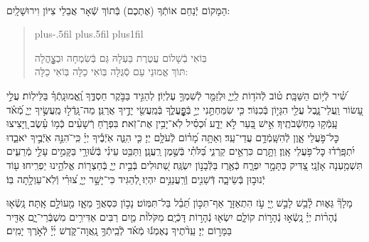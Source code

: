 \documentclass[twoside, openany, parskip=half, 11pt]{book}
\begin{document}
\begin{sometimes}

\\
הַמָּקוֹם יְֿנַחֵם אוֹתְֿךָ (אֶתְכֶם) בְּֿתוֹךְ שְֿׁאָר אֲבֵלֵי צִיּוֹן וִירוּשָׁלָֽיִם:

\end{sometimes}

\begin{quote}
 \leftskip=0pt plus-.5fil
 \rightskip=0pt plus.5fil
 \parfillskip=0pt plus1fil

 בּֽוֹאִי בְֿשָׁלוֹם עֲטֶרֶת בַּעְלָהּ \hfill
גַּם בְּֿשִׂמְחָה וּבְצׇׇׇׇׇׇׇׇָהֳלָה \\
תּוֹךְ אֱמוּנֵי עַם סְֿגֻּלָּה \hfill
בּֽוֹאִי כַלָּה בּֽוֹאִי כַלָּה:

\lechadodi

\end{quote}


שִׁ֝֗יר לְֿי֥וֹם הַשַּׁבָּֽת׃
ט֗וֹב לְֿהֹד֥וֹת לַֽיְיָ֑ וּלְזַמֵּ֖ר לְֿשִׁמְךָ֣ עֶלְיֽוֹן׃
לְהַגִּ֣יד בַּבֹּ֣קֶר חַסְדֶּ֑ךָ וֶֽ֝אֱמוּנָֽתְֿךָ֗ בַּלֵּילֽוֹת׃
עֲלֵ֣י עָ֭שׂוֹר וַֽעֲלֵי־נָ֑בֶל עֲלֵ֖י הִגָּי֣וֹן בְּֿכִנּֽוֹר׃
כִּ֤י שִׂמַּחְתַּ֣נִי יְיָ֣ בְּֿפׇׇׇׇׇׇׇׇׇׇׇׇׇׇָֽעֳלֶ֑ךָ בְּֿמַֽעֲשֵׂ֖י יָדֶ֣יךָ אֲרַנֵּֽן׃
מַה־גָּֽדְֿל֣וּ מַֽעֲשֶׂ֣יךָ יְיָ֑ מְֿ֝אֹ֗ד עָֽמְֿק֥וּ מַחְשְֿׁבֹתֶֽיךָ׃
אִ֣ישׁ בַּ֭עַר לֹ֣א יֵדָ֑ע וּ֝כְסִ֗יל לֹֽא־יָבִ֥ין אֶת־זֹֽאת׃
בִּפְרֹ֤חַ רְֿשָׁעִ֨ים כְּֿמ֥וֹ עֵ֗שֶׂב וַ֭יָּצִיצוּ כׇּל־פֹּ֣עֲלֵי אָ֑וֶן לְֿהִשָּֽׁמְֿדָ֥ם עֲדֵי־עַֽד׃
וְאַתָּ֥ה מָ֝ר֗וֹם לְֿעֹלָ֥ם יְיָ׃
כִּ֤י הִנֵּ֢ה אֹֽיְֿבֶ֡יךָ יְיָ֗ כִּֽי־ֹהִנֵּ֣ה אֹֽיְֿבֶ֣יךָ יֹאבֵ֑דוּ יִ֝תְפָּֽרְֿד֗וּ כׇּל־פֹּ֥עֲלֵי אָֽוֶן׃
וַתָּ֣רֶם כִּרְאֵ֣ים קַרְנִ֑י בַּ֝לֹּתִ֗י בְּֿשֶׁ֣מֶן רַֽעֲנָֽן׃
וַתַּבֵּ֥ט עֵינִ֗י בְּֿשׁ֫וּרָ֥י בַּקָּמִ֣ים עָלַ֣י מְֿרֵעִ֑ים תִּשְׁמַ֥עְנָה אָזְֿנָֽי׃
 צַ֭דִּיק כַּתָּמָ֣ר יִפְרָ֑ח כְּֿאֶ֖רֶז בַּלְּֿבָנ֣וֹן יִשְׂגֶּֽה׃
שְׁ֭תוּלִים בְּֿבֵ֣ית יְיָ֑ בְּֿחַצְר֖וֹת אֱלֹהֵ֣ינוּ יַפְרִֽיחוּ׃
ע֖וֹד יְֿנוּב֣וּן בְּֿשֵׂיבָ֑ה דְּֿשֵׁנִ֖ים וְֿרַֽעֲנַנִּ֣ים יִהְיֽוּ׃
לְ֭הַגִּיד כִּי־יָשָׁ֣ר יְיָ֑ צ֝וּרִ֗י וְֿלֹֽא־עַוְלָ֥תָה בּֽוֹ׃

 מָלָךְ֘ גֵּא֢וּת לָ֫בֵ֥שׁ לָבֵ֣שׁ יְ֖יָ עֹ֣ז הִתְאַזָּר֑ אַף־תִּכּ֣וֹן תֵּ֝בֵ֗ל בַּל־תִּמּֽוֹט׃
נָכ֣וֹן כִּסְאֲךָ֣ מֵאָ֑ז מֵ֖עוֹלָ֣ם אָֽתָּה׃
נָֽשְֿׂא֤וּ נְֿהָר֨וֹת יְיָ֗ נָֽשְֿׂא֣וּ נְֿהָר֣וֹת קוֹלָ֑ם יִשְׂא֖וּ נְֿהָר֣וֹת דָּכְֿיָֽם׃
 מִקֹּלוֹ֨ת מַ֤יִם רַבִּים אַדִּירִ֥ים מִשְׁבְּֿרֵי־יָ֑ם אַדִּ֖יר בַּמָּר֣וֹם יְיָ׃
עֵֽדֹ֨תֶיךָ נֶאֶמְנ֬וּ מְֿאֹ֗ד לְֿבֵֽיתְֿךָ֥ נָֽאֲוָה־קֹּ֑דֶשׁ יְ֜יָ֗ לְֿאֹ֣רֶךְ יָמִֽים׃

\mournerskaddish

\end{document}
